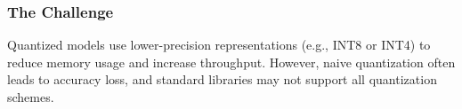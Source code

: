 \subsubsection{The Challenge}

Quantized models use lower-precision representations (e.g., INT8 or INT4) to reduce memory usage and increase throughput. However, naive quantization often leads to accuracy loss, and standard libraries may not support all quantization schemes.

